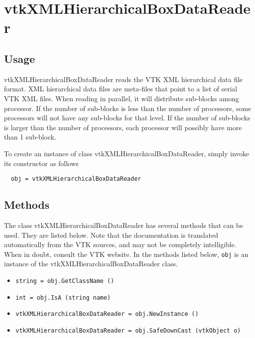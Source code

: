\section{vtkXMLHierarchicalBoxDataReader}

\subsection{Usage}

 vtkXMLHierarchicalBoxDataReader reads the VTK XML hierarchical data file
 format. XML hierarchical data files are meta-files that point to a list
 of serial VTK XML files. When reading in parallel, it will distribute
 sub-blocks among processor. If the number of sub-blocks is less than
 the number of processors, some processors will not have any sub-blocks
 for that level. If the number of sub-blocks is larger than the
 number of processors, each processor will possibly have more than
 1 sub-block.

To create an instance of class vtkXMLHierarchicalBoxDataReader, simply
invoke its constructor as follows
\begin{verbatim}
  obj = vtkXMLHierarchicalBoxDataReader
\end{verbatim}
\subsection{Methods}

The class vtkXMLHierarchicalBoxDataReader has several methods that can be used.
  They are listed below.
Note that the documentation is translated automatically from the VTK sources,
and may not be completely intelligible.  When in doubt, consult the VTK website.
In the methods listed below, \verb|obj| is an instance of the vtkXMLHierarchicalBoxDataReader class.
\begin{itemize}
\item  \verb|string = obj.GetClassName ()|

\item  \verb|int = obj.IsA (string name)|

\item  \verb|vtkXMLHierarchicalBoxDataReader = obj.NewInstance ()|

\item  \verb|vtkXMLHierarchicalBoxDataReader = obj.SafeDownCast (vtkObject o)|

\end{itemize}

